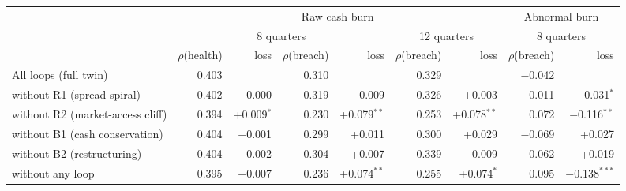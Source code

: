 \begin{tabular}{lrrrrrrrr}
\toprule
 & \multicolumn{6}{c}{Raw cash burn} & \multicolumn{2}{c}{Abnormal burn} \\
\cmidrule(lr){2-7}\cmidrule(lr){8-9}
 & \multicolumn{4}{c}{8 quarters} & \multicolumn{2}{c}{12 quarters} & \multicolumn{2}{c}{8 quarters} \\
\cmidrule(lr){2-5}\cmidrule(lr){6-7}\cmidrule(lr){8-9}
 & $\rho$(health) & loss & $\rho$(breach) & loss & $\rho$(breach) & loss & $\rho$(breach) & loss \\
\midrule
All loops (full twin) & 0.403 &  & 0.310 &  & 0.329 &  & $-$0.042 &  \\
without R1 (spread spiral) & 0.402 & +0.000 & 0.319 & $-$0.009 & 0.326 & +0.003 & $-$0.011 & $-$0.031$^{*}$ \\
without R2 (market-access cliff) & 0.394 & +0.009$^{*}$ & 0.230 & +0.079$^{**}$ & 0.253 & +0.078$^{**}$ & 0.072 & $-$0.116$^{**}$ \\
without B1 (cash conservation) & 0.404 & $-$0.001 & 0.299 & +0.011 & 0.300 & +0.029 & $-$0.069 & +0.027 \\
without B2 (restructuring) & 0.404 & $-$0.002 & 0.304 & +0.007 & 0.339 & $-$0.009 & $-$0.062 & +0.019 \\
without any loop & 0.395 & +0.007 & 0.236 & +0.074$^{**}$ & 0.255 & +0.074$^{*}$ & 0.095 & $-$0.138$^{***}$ \\
\bottomrule
\end{tabular}
